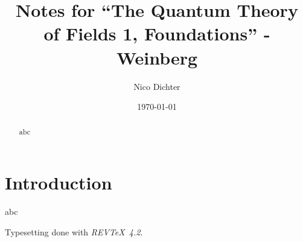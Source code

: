 \documentclass[%
reprint,
amsmath,amssymb,
aps,
pra,
floatfix,
]{revtex4-2}
\begin{document}
	\title{Notes for \enquote{The Quantum Theory of Fields 1, Foundations} - Weinberg}
	
	\author{Nico Dichter}
	
	
	\date{\today}
	
	\begin{abstract}
		abc
	\end{abstract}
	
	\maketitle
	
	\section{Introduction}\label{sec:introduction}
	abc
	
	
	
	
	\begin{acknowledgments}
		Typesetting done with \emph{REV\TeX\ 4.2}.
	\end{acknowledgments}
	
	
	
	
	
	
	
\end{document}
